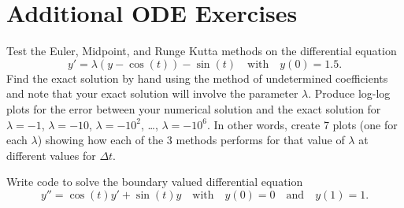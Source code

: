 \newpage\section{Additional ODE Exercises}
\begin{problem}
    Test the Euler, Midpoint, and Runge Kutta methods on the differential
    equation
    \[ y' = \lambda \left( y - \cos(t) \right) - \sin(t) \quad \text{with} \quad y(0) = 1.5. \]
    Find the exact solution by hand using the method of undetermined coefficients and note
    that your exact solution will involve the parameter $\lambda$.  Produce log-log plots
    for the error between your numerical solution and the exact solution for $\lambda =
    -1$, $\lambda = -10$, $\lambda = -10^2$, \ldots, $\lambda = -10^6$.  In other words,
    create 7 plots (one for each $\lambda$) showing how each of the 3 methods performs for
    that value of $\lambda$ at different values for $\Delta t$.
\end{problem}

\begin{problem}
    Write code to solve the boundary valued differential equation
    \[ y'' = \cos(t) y' + \sin(t) y \quad \text{with} \quad y(0) = 0 \quad \text{and}
        \quad y(1) = 1. \]
\end{problem}

